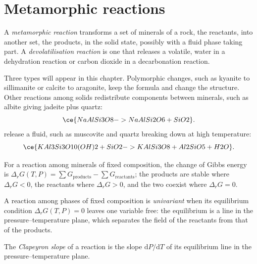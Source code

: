 \section{Metamorphic reactions}\label{sec:b2:metamorphic-facies:reactions}

\begin{definition}\label{def:b2:metamorphic-facies:reaction}
A \emph{metamorphic reaction} transforms a set of minerals
of a rock, the reactants, into another set, the products, in the solid state, possibly
with a fluid phase taking part. A \emph{devolatilisation reaction} is one that releases a volatile, water in a dehydration reaction or carbon
dioxide in a decarbonation reaction.
\end{definition}

Three types will appear in this chapter. Polymorphic changes, such as kyanite to
sillimanite or calcite to aragonite, keep the formula and change the structure.
Other reactions among solids redistribute components between minerals, such as
albite giving jadeite plus quartz:
\[
\ce{NaAlSi3O8 -> NaAlSi2O6 + SiO2}.
\]
 release a fluid, such as muscovite and quartz breaking down
at high temperature:
\[
\ce{KAl3Si3O10(OH)2 + SiO2 -> KAlSi3O8 + Al2SiO5 + H2O}.
\]

For a reaction among minerals of fixed composition, the change of Gibbs energy is
$\Delta_r G(T, P) = \sum G_{\text{products}} - \sum G_{\text{reactants}}$; the products
are stable where $\Delta_r G < 0$, the reactants where $\Delta_r G > 0$, and the two
coexist where $\Delta_r G = 0$.

\begin{definition}\label{def:b2:metamorphic-facies:univariant}
A reaction among phases of fixed composition is \emph{univariant} when its equilibrium condition $\Delta_r G(T, P) = 0$ leaves one variable
free: the equilibrium is a line in the pressure--temperature plane, which separates
the field of the reactants from that of the products.
\end{definition}

\begin{definition}\label{def:b2:metamorphic-facies:clapeyron}
The \emph{Clapeyron slope} of a reaction is the slope
$\mathrm dP/\mathrm dT$ of its equilibrium line in the pressure--temperature plane.
\end{definition}

